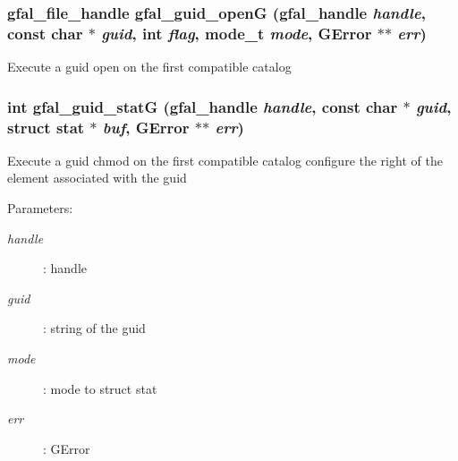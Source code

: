 \subsubsection{\setlength{\rightskip}{0pt plus 5cm}gfal\_\-file\_\-handle gfal\_\-guid\_\-open\-G (gfal\_\-handle {\em handle}, const char $\ast$ {\em guid}, int {\em flag}, mode\_\-t {\em mode}, GError $\ast$$\ast$ {\em err})}\label{gfal__common__guid_8c_4840abc33d84aa6fdd9df4a43dff946c}


Execute a guid open on the first compatible catalog 
\subsubsection{\setlength{\rightskip}{0pt plus 5cm}int gfal\_\-guid\_\-stat\-G (gfal\_\-handle {\em handle}, const char $\ast$ {\em guid}, struct stat $\ast$ {\em buf}, GError $\ast$$\ast$ {\em err})}\label{gfal__common__guid_8c_8aebd0a4a29dd4154971395741587405}


Execute a guid chmod on the first compatible catalog configure the right of the element associated with the guid \begin{Desc}
\item[Parameters:]
\begin{description}
\item[{\em handle}]: handle \item[{\em guid}]: string of the guid \item[{\em mode}]: mode to struct stat \item[{\em err}]: GError \end{description}
\end{Desc}
